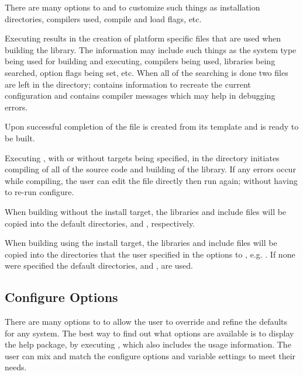 There are many options to  and  to customize such
things as installation directories, compilers used, compile and load flags, etc.

Executing  results in the creation of platform specific files
that are used when building the library. The information may include such things
as the system type being used for building and executing, compilers being used,
libraries being searched, option flags being set, etc.  When all of the
searching is done two files are left in the  directory;
 contains information to recreate the current configuration
and  contains compiler messages which may help in debugging
 errors.

Upon successful completion of  the file
 is created from its template
 and \hypre{} is ready to be built.

Executing , with or without targets being specified, in the
 directory initiates compiling of all of the source code and building
of the \hypre{} library.  If any errors occur while compiling, the user can edit
the file  directly then run  again;
without having to re-run configure.

When building \hypre{} without the install target, the libraries and include
files will be copied into the default directories,  and
, respectively.

When building \hypre{} using the install target, the libraries and include files
will be copied into the directories that the user specified in the options to
, e.g. .  If none were specified the
default directories,  and , are
used.


\subsection{Configure Options}\label{config_options}

There are many options to  to allow the user to override and
refine the defaults for any system. The best way to find out what options are
available is to display the help package, by executing , which also includes the usage information.  The user can mix and match
the configure options and variable settings to meet their needs.

